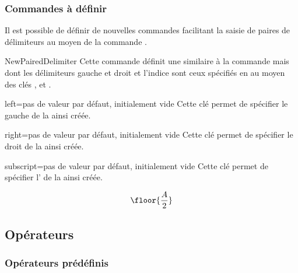 \documentclass[french,nolocaltoc]{nwejmart}
\newtheorem[title=Fait,style=definition]{fact}
\begin{document}
\subsubsection{Commandes à définir}

Il est possible de définir de nouvelles commandes facilitant la saisie de paires
de délimiteurs au moyen de la commande .
%
\begin{docCommand}{NewPairedDelimiter}{}
  Cette commande définit une  similaire à la commande
   mais dont les délimiteurs gauche et droit et l'indice
  sont ceux spécifiés en  au moyen des clés ,
   et .
  \begin{docKey}{left}{=}{pas de valeur par défaut,
      initialement vide}
    Cette clé permet de spécifier le  gauche de la  ainsi
    créée.
  \end{docKey}
  \begin{docKey}{right}{=}{pas de valeur par défaut,
      initialement vide}
    Cette clé permet de spécifier le  droit de la
     ainsi créée.
  \end{docKey}
  \begin{docKey}{subscript}{=}{pas de valeur par défaut,
      initialement vide}
    Cette clé permet de spécifier l' de la  ainsi
    créée.
  \end{docKey}
\end{docCommand}

\begin{preamblecode}
\end{preamblecode}
\begin{bodycode}
\begin{equation}
\floor{\frac{A}{2}}
\end{equation}
\end{bodycode}

\subsection{Opérateurs}

\subsubsection{Opérateurs prédéfinis}
\end{document}
